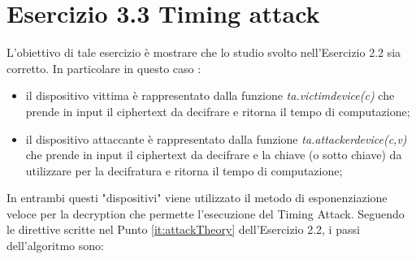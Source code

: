 \documentclass{article}
\begin{document}
\section*{Esercizio 3.3 Timing attack}
L'obiettivo di tale esercizio è mostrare che lo studio svolto nell'Esercizio 2.2 sia corretto. In particolare in questo caso :
\begin{itemize}
    \item il dispositivo vittima è rappresentato dalla funzione \textit{ta.victimdevice(c)} che prende in input il ciphertext da decifrare e ritorna il tempo di computazione;
    \item il dispositivo attaccante è rappresentato dalla funzione \textit{ta.attackerdevice(c,v)} che prende in input il ciphertext da decifrare e la chiave (o sotto chiave) da utilizzare per la decifratura e ritorna il tempo di computazione;
\end{itemize}
In entrambi questi "dispositivi" viene utilizzato il metodo di esponenziazione veloce per la decryption che permette l'esecuzione del Timing Attack. %
Seguendo le direttive scritte nel Punto \ref{it:attackTheory} dell'Esercizio 2.2, i passi dell'algoritmo sono:
\end{document}
